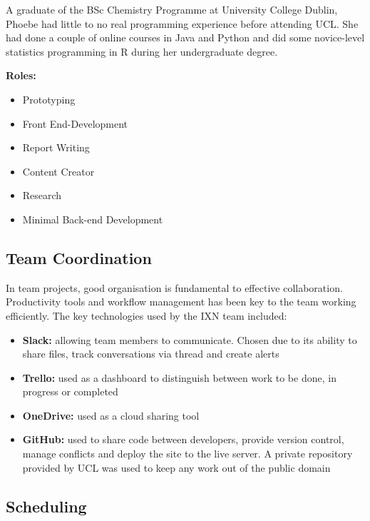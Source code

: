 \documentclass[fontsize=10pt]{extarticle}
\numberwithin{figure}{section} %
\providecommand{\tightlist}{%
  \setlength{\itemsep}{0pt}\setlength{\parskip}{0pt}}
\begin{document}
A graduate of the BSc Chemistry Programme at University College Dublin,
Phoebe had little to no real programming experience before attending
UCL. She had done a couple of online courses in Java and Python and did
some novice-level statistics programming in R during her undergraduate
degree.

\textbf{Roles:}

\begin{itemize}
\tightlist
\item
  Prototyping
\item
  Front End-Development
\item
  Report Writing
\item
  Content Creator
\item
  Research
\item
  Minimal Back-end Development
\end{itemize}

\hypertarget{team-coordination}{%
\subsection{Team Coordination}\label{team-coordination}}

In team projects, good organisation is fundamental to effective
collaboration. Productivity tools and workflow management has been key
to the team working efficiently. The key technologies used by the IXN
team included:

\begin{itemize}
\tightlist
\item
  \textbf{Slack:} allowing team members to communicate. Chosen due to
  its ability to share files, track conversations via thread and create
  alerts
\item
  \textbf{Trello:} used as a dashboard to distinguish between work to be
  done, in progress or completed
\item
  \textbf{OneDrive:} used as a cloud sharing tool
\item
  \textbf{GitHub:} used to share code between developers, provide
  version control, manage conflicts and deploy the site to the live
  server. A private repository provided by UCL was used to keep any work
  out of the public domain
\end{itemize}

\hypertarget{scheduling}{%
\subsection{Scheduling}\label{scheduling}}
\end{document}
